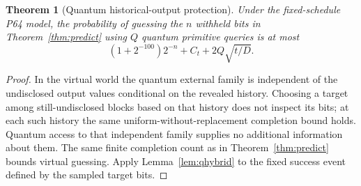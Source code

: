 \documentclass[11 pt,a 4 paper]{article}
\newtheorem{theorem}{Theorem}
\begin{document}
\begin{theorem}[Quantum historical-output protection]\label{thm:qpredict}
Under the fixed-schedule P64 model, the probability of guessing the $ n $ withheld bits in Theorem~\ref{thm:predict} using $ Q $ quantum primitive queries is at most
\begin{equation}
 (1+2^{-100})2^{-n}+C_t+2 Q\sqrt{t/D}.\label{eq:qprediction}
\end{equation}
\end{theorem}
\begin{proof}
In the virtual world the quantum external family is independent of the undisclosed output values conditional on the revealed history. Choosing a target among still-undisclosed blocks based on that history does not inspect its bits; at each such history the same uniform-without-replacement completion bound holds. Quantum access to that independent family supplies no additional information about them. The same finite completion count as in Theorem~\ref{thm:predict} bounds virtual guessing. Apply Lemma~\ref{lem:qhybrid} to the fixed success event defined by the sampled target bits.
\end{proof}
\end{document}
